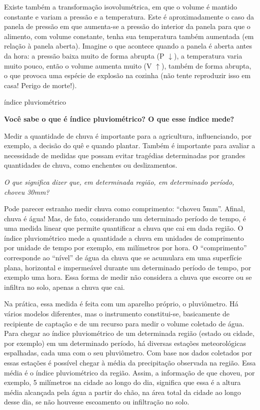 \begin{reflection}{}
Existe também a transformação isovolumétrica, em que o volume é mantido constante e variam a pressão e a temperatura. Este é aproximadamente o caso da panela de pressão em que aumenta-se a pressão do interior da panela para que o alimento, com volume constante, tenha sua temperatura também aumentada (em relação à panela aberta). Imagine o que acontece quando a panela é aberta antes da hora: a pressão baixa muito de forma abrupta (P \(\downarrow\)), a temperatura varia muito pouco, então o volume aumenta muito (V \(\uparrow\)), também de forma abrupta, o que provoca uma espécie de explosão na cozinha (não tente reproduzir isso em casa! Perigo de morte!).
\end{reflection}

\begin{task}{índice pluviométrico}



\textbf{Você sabe o que é índice pluviométrico? O que esse índice mede?}

Medir a quantidade de chuva é importante para a agricultura, influenciando, por exemplo, a decisão do quê e quando plantar.  Também é importante para avaliar a necessidade de medidas que possam evitar tragédias determinadas por grandes quantidades de chuva, como enchentes ou deslizamentos.

\emph{O que significa dizer que, em determinada região, em determinado período, choveu 30mm?}

Pode parecer estranho medir chuva como comprimento: “choveu 5mm”. Afinal, chuva é água! Mas, de fato, considerando um determinado período de tempo, é uma medida linear que permite quantificar a chuva que cai em dada região. O índice pluviométrico mede a quantidade a chuva em unidades de comprimento por unidade de tempo \textendash{} por exemplo, em milímetros por hora. O “comprimento” corresponde ao “nível” de água da chuva que se acumulara em uma superfície plana, horizontal e impermeável durante um determinado período de tempo, por exemplo uma hora. Essa forma de medir não considera a chuva que escorre ou se infiltra no solo, apenas a chuva que cai.

Na prática, essa medida é feita com um aparelho próprio, o pluviômetro. Há vários modelos diferentes, mas o instrumento constitui-se, basicamente de recipiente de captação e de um recurso para medir o volume coletado de água. Para chegar ao índice pluviométrico de um determinada região (estado ou cidade, por exemplo) em um determinado período, há diversas estações meteorológicas espalhadas, cada uma com o seu pluviômetro. Com base nos dados coletados por essas estações é possível chegar à média da precipitação observada na região. Essa média é o índice pluviométrico da região. Assim, a informação de que choveu, por exemplo, 5 milímetros na cidade ao longo do dia, significa que essa é a altura média alcançada pela água a partir do chão, na área total da cidade ao longo desse dia, se não houvesse escoamento ou infiltração no solo.


\end{task}
